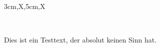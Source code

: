 \documentclass[a3paper,scifiposter,style=scifi]{tubsposter}
\begin{document}
  \begin{tubsposter}{3cm,X,5cm,X}
  \begin{posterrow}
    ~
  \end{posterrow}
  \begin{posterrow}[X,X]
    \begin{postercol}
      Dies ist ein Testtext, der absolut keinen Sinn hat.
    \end{postercol}
    \begin{postercol}[3cm,X]
      \begin{postersubrow}
        ~
      \end{postersubrow}
      \begin{postersubrow}
        ~
      \end{postersubrow}
    \end{postercol}
  \end{posterrow}
  \begin{posterrow}
    ~
  \end{posterrow}
  \begin{posterrow}
    ~
  \end{posterrow}
\end{tubsposter}
\end{document}
